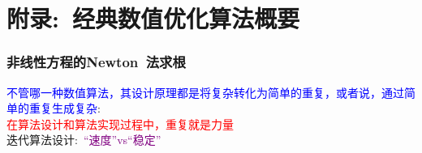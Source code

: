 
\subject{}
\frame
{
\titlepage
}


\small
\appendix
\section{附录:~经典数值优化算法概要}
\frame
{
	\frametitle{非线性方程的\textrm{Newton~}法求根}
	\textcolor{blue}{不管哪一种数值算法，其设计原理都是将复杂转化为简单的重复，或者说，通过简单的重复生成复杂}:\\
	\textcolor{red}{在算法设计和算法实现过程中，重复就是力量}\\
迭代算法设计:~\textcolor{purple}{“速度”\textrm{vs}“稳定”}
\begin{figure}[h!]
\centering
{}
\label{Equation_Newon}
\end{figure}
}

